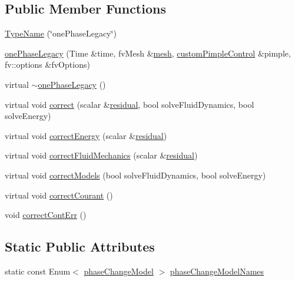 \subsection*{Public Member Functions}
\begin{DoxyCompactItemize}
\item 
\hyperlink{classFoam_1_1thermalHydraulicsModels_1_1onePhaseLegacy_adecda190eb05a0397c5fff1eb5d3ff1a}{Type\+Name} (\char`\"{}one\+Phase\+Legacy\char`\"{})
\item 
\hyperlink{classFoam_1_1thermalHydraulicsModels_1_1onePhaseLegacy_ad1fa2bf55ac7d53d9f03048c680331af}{one\+Phase\+Legacy} (Time \&time, fv\+Mesh \&\hyperlink{createMeshesPostProcess_8H_a8bb1e58291d2d2b653e024a4f4bffe38}{mesh}, \hyperlink{classFoam_1_1customPimpleControl}{custom\+Pimple\+Control} \&pimple, fv\+::options \&fv\+Options)
\item 
virtual \hyperlink{classFoam_1_1thermalHydraulicsModels_1_1onePhaseLegacy_a3a095f5033177efd20e21c6074c6dd7d}{$\sim$one\+Phase\+Legacy} ()
\item 
virtual void \hyperlink{classFoam_1_1thermalHydraulicsModels_1_1onePhaseLegacy_ace6b3314b058f5c94eb96f99a1f4784d}{correct} (scalar \&\hyperlink{solveThermalMechanics_8H_a840cf6bbf9aacf15bd364b478394c3a7}{residual}, bool solve\+Fluid\+Dynamics, bool solve\+Energy)
\item 
virtual void \hyperlink{classFoam_1_1thermalHydraulicsModels_1_1onePhaseLegacy_ad7a94cfeb7bfe17f10cb2a3782e1e896}{correct\+Energy} (scalar \&\hyperlink{solveThermalMechanics_8H_a840cf6bbf9aacf15bd364b478394c3a7}{residual})
\item 
virtual void \hyperlink{classFoam_1_1thermalHydraulicsModels_1_1onePhaseLegacy_adfb5aa92b87e35ceaf380442a10e1094}{correct\+Fluid\+Mechanics} (scalar \&\hyperlink{solveThermalMechanics_8H_a840cf6bbf9aacf15bd364b478394c3a7}{residual})
\item 
virtual void \hyperlink{classFoam_1_1thermalHydraulicsModels_1_1onePhaseLegacy_ab339c59ef518e68e6ba82997b9d06454}{correct\+Models} (bool solve\+Fluid\+Dynamics, bool solve\+Energy)
\item 
virtual void \hyperlink{classFoam_1_1thermalHydraulicsModels_1_1onePhaseLegacy_a9e1998999bc6cfc318ce37ca9499742e}{correct\+Courant} ()
\item 
void \hyperlink{classFoam_1_1thermalHydraulicsModels_1_1onePhaseLegacy_acf57719bd1e87c69f632508ce2a90930}{correct\+Cont\+Err} ()
\end{DoxyCompactItemize}
\subsection*{Static Public Attributes}
\begin{DoxyCompactItemize}
\item 
static const Enum$<$ \hyperlink{classFoam_1_1thermalHydraulicsModels_1_1onePhaseLegacy_abff38c5556db16d4d52ef9df211931ff}{phase\+Change\+Model} $>$ \hyperlink{classFoam_1_1thermalHydraulicsModels_1_1onePhaseLegacy_a964e3a45d8bf0c9f774166d07466fe4c}{phase\+Change\+Model\+Names}
\end{DoxyCompactItemize}

